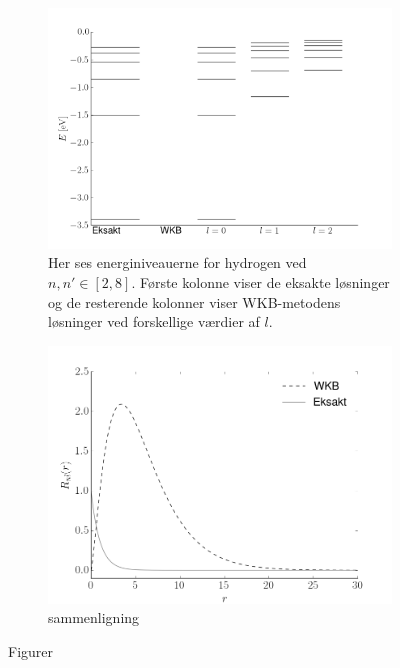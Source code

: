 \begin{figure}[h!]
    \centering
    \begin{subfigure}{0.45\columnwidth}
        \centering
        \includegraphics[width=\columnwidth]{energyPlot}
        \caption{Her ses energiniveauerne for hydrogen ved $n, n'\in[2, 8]$. Første kolonne viser de eksakte løsninger og de resterende kolonner viser WKB-metodens løsninger ved forskellige værdier af $l$.} 
        \label{fig:hydrogen}
    \end{subfigure}
    \begin{subfigure}{0.45\columnwidth}
        \centering
        \includegraphics[width=\columnwidth]{sammenligning}
        \caption{sammenligning}
        \label{fig:sammenligning}
    \end{subfigure}
    \caption{Figurer}
    \label{bigfig}
\end{figure}
